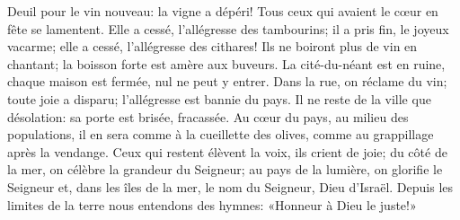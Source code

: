 Deuil pour le vin nouveau: la vigne a dépéri!
	Tous ceux qui avaient le cœur en fête se lamentent.
Elle a cessé, l’allégresse des tambourins; il a pris fin, le joyeux vacarme;
	elle a cessé, l’allégresse des cithares!
Ils ne boiront plus de vin en chantant;
	la boisson forte est amère aux buveurs.
La cité-du-néant est en ruine,
	chaque maison est fermée, nul ne peut y entrer.
Dans la rue, on réclame du vin;
	toute joie a disparu; l’allégresse est bannie du pays.
Il ne reste de la ville que désolation:
	sa porte est brisée, fracassée.
Au cœur du pays, au milieu des populations,
	il en sera comme à la cueillette des olives, comme au grappillage après la vendange.
Ceux qui restent élèvent la voix, ils crient de joie;
	du côté de la mer, on célèbre la grandeur du Seigneur;
	au pays de la lumière, on glorifie le Seigneur
	et, dans les îles de la mer, le nom du Seigneur, Dieu d’Israël.
Depuis les limites de la terre nous entendons des hymnes:
	«Honneur à Dieu le juste!»
